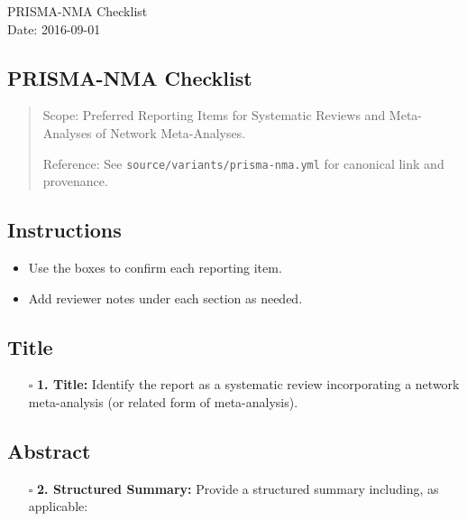\documentclass[11pt]{article}
\def\tightlist{}
\begin{document}
\begin{center}
{\LARGE PRISMA-NMA Checklist}\\[4pt]
\normalsize Date: 2016-09-01
\end{center}
\vspace{1em}

\begin{Form}

\section{PRISMA-NMA Checklist}\label{prisma-nma-checklist}

\begin{quote}
Scope: Preferred Reporting Items for Systematic Reviews and
Meta-Analyses of Network Meta-Analyses.

Reference: See \texttt{source/variants/prisma-nma.yml} for canonical
link and provenance.
\end{quote}

\subsection{Instructions}\label{instructions}

\begin{itemize}
\tightlist
\item
  Use the boxes to confirm each reporting item.
\item
  Add reviewer notes under each section as needed.
\end{itemize}

\subsection{Title}\label{title}

\begin{itemize}
\tightlist
\item[$\square$]
  \textbf{1. Title:} Identify the report as a systematic review
  incorporating a network meta-analysis (or related form of
  meta-analysis).
\end{itemize}

\subsection{Abstract}\label{abstract}

\begin{itemize}
\tightlist
\item[$\square$]
  \textbf{2. Structured Summary:} Provide a structured summary
  including, as applicable:


\end{itemize}
\end{Form}
\end{document}
